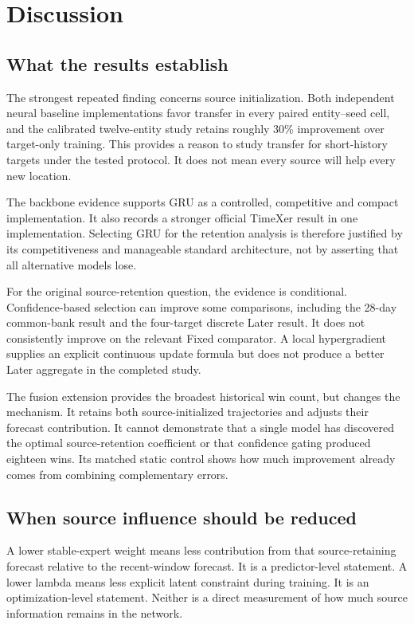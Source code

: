 \documentclass[pdflatex,iicol,sn-mathphys-num]{sn-jnl}
\begin{document}
\section{Discussion}
\subsection{What the results establish}
The strongest repeated finding concerns source initialization. Both independent neural baseline implementations favor transfer in every paired entity--seed cell, and the calibrated twelve-entity study retains roughly 30\% improvement over target-only training. This provides a reason to study transfer for short-history targets under the tested protocol. It does not mean every source will help every new location.

The backbone evidence supports GRU as a controlled, competitive and compact implementation. It also records a stronger official TimeXer result in one implementation. Selecting GRU for the retention analysis is therefore justified by its competitiveness and manageable standard architecture, not by asserting that all alternative models lose.

For the original source-retention question, the evidence is conditional. Confidence-based selection can improve some comparisons, including the 28-day common-bank result and the four-target discrete Later result. It does not consistently improve on the relevant Fixed comparator. A local hypergradient supplies an explicit continuous update formula but does not produce a better Later aggregate in the completed study.

The fusion extension provides the broadest historical win count, but changes the mechanism. It retains both source-initialized trajectories and adjusts their forecast contribution. It cannot demonstrate that a single model has discovered the optimal source-retention coefficient or that confidence gating produced eighteen wins. Its matched static control shows how much improvement already comes from combining complementary errors.

\subsection{When source influence should be reduced}
A lower stable-expert weight means less contribution from that source-retaining forecast relative to the recent-window forecast. It is a predictor-level statement. A lower lambda means less explicit latent constraint during training. It is an optimization-level statement. Neither is a direct measurement of how much source information remains in the network.
\end{document}
